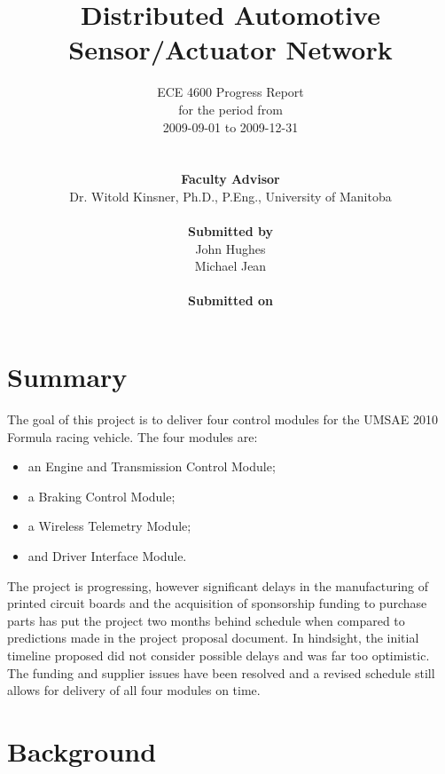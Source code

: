 \documentclass[12pt]{report}
\begin{document}
\title{Distributed Automotive Sensor/Actuator Network}
\author{
	\hline
	ECE 4600 Progress Report\\
	for the period from
	\\2009-09-01 to 2009-12-31\\
	\hline
	\\ \\
	\textbf{Faculty Advisor}\\
	Dr. Witold Kinsner, Ph.D., P.Eng., University of Manitoba\\
	\\
	\textbf{Submitted by}\\
	John Hughes\\
	Michael Jean
	\\ \\
	\textbf{Submitted on}
	\vspace{-2em}
}
\maketitle

\section{Summary}

The goal of this project is to deliver four control modules for the UMSAE 2010 Formula racing vehicle. The four modules are:
\begin{itemize}
 \item an Engine and Transmission Control Module;
 \item a Braking Control Module;
 \item a Wireless Telemetry Module;
 \item and Driver Interface Module.
\end{itemize}
The project is progressing, however significant delays in the manufacturing of printed circuit boards and the acquisition of sponsorship funding to purchase parts has put the project two months behind schedule when compared to predictions made in the project proposal document. In hindsight, the initial timeline proposed did not consider possible delays and was far too optimistic. The funding and supplier issues have been resolved and a revised schedule still allows for delivery of all four modules on time. 

\pagebreak

\section{Background}
\end{document}
